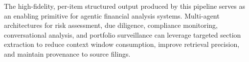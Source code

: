 \documentclass[12pt,letterpaper,oneside]{article}
\begin{document}
The high-fidelity, per-item structured output produced by this
pipeline serves as an enabling primitive for agentic financial
analysis systems. Multi-agent architectures for risk assessment,
due diligence, compliance monitoring, conversational analysis, and
portfolio surveillance can leverage targeted section extraction to
reduce context window consumption, improve retrieval precision, and
maintain provenance to source filings.

\printbibliography
\end{document}

